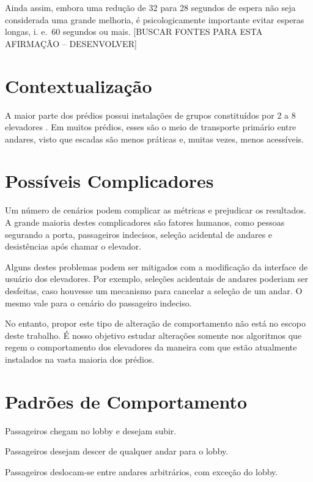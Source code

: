 Ainda assim, embora uma redução de 32 para 28 segundos de espera não seja considerada uma grande melhoria, é psicologicamente importante evitar esperas longas, i. e.~60 segundos ou mais. {\color{red}[BUSCAR FONTES PARA ESTA AFIRMAÇÃO -- DESENVOLVER]} %

\section{Contextualização}

A maior parte dos prédios possui instalações de grupos constituídos por 2 a 8
elevadores \cite{KOEHLEROTTIGER02}. Em muitos prédios, esses são o meio de
transporte primário entre andares, visto que escadas são menos práticas e,
muitas vezes, menos acessíveis. %

\section{Possíveis Complicadores}

Um número de cenários podem complicar as métricas e prejudicar os resultados. A
grande maioria destes complicadores são fatores humanos, como pessoas segurando
a porta, passageiros indecisos, seleção acidental de andares e desistências após
chamar o elevador.

Alguns destes problemas podem ser mitigados com a modificação da interface de
usuário dos elevadores. Por exemplo, seleções acidentais de andares poderiam ser
desfeitas, caso houvesse um mecanismo para cancelar a seleção de um andar. O mesmo vale para o cenário do passageiro indeciso.

No entanto, propor este tipo de alteração de comportamento não está no escopo
deste trabalho. É nosso objetivo estudar alterações somente nos algoritmos que
regem o comportamento dos elevadores da maneira com que estão atualmente
instalados na vasta maioria dos prédios.

\section{Padrões de Comportamento}

\begin{description}[leftmargin=!,labelwidth=\widthof{\bfseries interfloor}]
  \item[up peak]    Passageiros chegam no lobby e desejam subir.
  \item[down peak]  Passageiros desejam descer de qualquer andar para o lobby.
  \item[interfloor] Passageiros deslocam-se entre andares arbitrários, com exceção do lobby.
\end{description}

